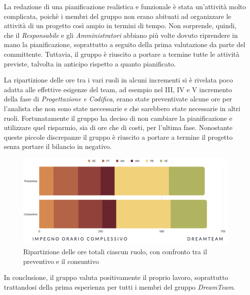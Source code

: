 La redazione di una pianificazione realistica e funzionale è stata un'attività molto complicata, poichè i membri del gruppo non erano abituati ad organizzare le attività di un progetto così ampio in termini di tempo. Non sorprende, quindi, che il \textit{Responsabile} e gli \textit{Amministratori} abbiano più volte dovuto riprendere in mano la pianificazione, soprattutto a seguito della prima valutazione da parte del committente. Tuttavia, il gruppo è riuscito a portare a termine tutte le attività previste, talvolta in anticipo rispetto a quanto pianificato.

La ripartizione delle ore tra i vari ruoli in alcuni incrementi si è rivelata poco adatta alle effettive esigenze del team, ad esempio nel III, IV e V incremento della fase di \textit{Progettazione e Codifica}, erano state preventivate alcune ore per l'analista che non sono state neccessarie e che sarebbero state necessarie in altri ruoli. Fortunatamente il gruppo ha deciso di non cambiare la pianificazione e utilizzare quel risparmio, sia di ore che di costi, per l'ultima fase. Nonostante queste piccole discrepanze il gruppo è riuscito a portare a termine il progetto senza portare il bilancio in negativo.

\begin{figure}[H]
\centering
\includegraphics[scale=0.53]{Sezioni/SezioniPreventivo/grafici/Impegno_orario_complessivo.png}
\caption{Ripartizione delle ore totali ciascun ruolo, con confronto tra il preventivo e il consuntivo}
\end{figure}

In conclusione, il gruppo valuta positivamente il proprio lavoro, soprattutto trattandosi della prima esperienza per tutti i membri del gruppo \textit{DreamTeam}.



